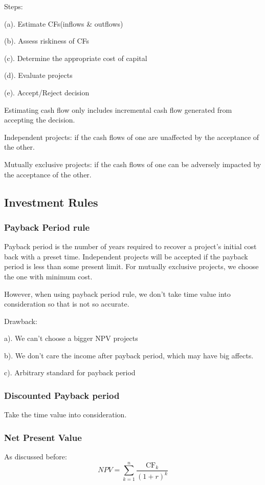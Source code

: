 \documentclass[10pt, a4paper]{article}
\begin{document}
            Steps:

            \quad(a). Estimate CFs(inflows \& outflows)
            
            \quad(b). Assess riskiness of CFs

            \quad(c). Determine the appropriate cost of capital 

            \quad(d). Evaluate projects 
            
            \quad(e). Accept/Reject decision 

            Estimating cash flow only includes incremental cash flow generated from accepting the decision.
            
            Independent projects: if the cash flows of one are unaffected by the acceptance of the other. 

            Mutually exclusive projects: if the cash flows of one can be adversely impacted by the acceptance of the other. 
        \subsection{Investment Rules} 
            \subsubsection{Payback Period rule}
                Payback period is the number of years required to recover a project's initial cost back with a preset time. Independent projects will be accepted if the payback period is less than some present limit. For mutually exclusive projects, we choose the one with minimum cost.

                However, when using payback period rule, we don't take time value into consideration so that is not so accurate. 

                Drawback:
                
                \quad a). We can't choose a bigger NPV projects 
                
                \quad b). We don't care the income after payback period, which may have big affects. 

                \quad c). Arbitrary standard for payback period
            \subsubsection{Discounted Payback period}
                Take the time value into consideration. 
            \subsubsection{Net Present Value}
                As discussed before:
                $$NPV = \sum_{k = 1}^{n}\frac{\text{CF}_k}{(1 + r)^k}$$
\end{document}
